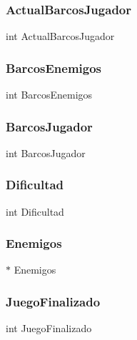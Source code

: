 \subsubsection{Actual\+Barcos\+Jugador}
{\footnotesize\ttfamily int Actual\+Barcos\+Jugador}

\label{struct_board_a5e5259bb1e509797d3ab3e435b14d17f} 
\subsubsection{Barcos\+Enemigos}
{\footnotesize\ttfamily int Barcos\+Enemigos}

\label{struct_board_ac2241783b723066e28738dd0cbb2624e} 
\subsubsection{Barcos\+Jugador}
{\footnotesize\ttfamily int Barcos\+Jugador}

\label{struct_board_a33e91e208e69c833cb1f04c86f371337} 
\subsubsection{Dificultad}
{\footnotesize\ttfamily int Dificultad}

\label{struct_board_ae46a086677666832abca3fdc41d463ea} 
\subsubsection{Enemigos}
{\footnotesize{}$\ast$ Enemigos}

\label{struct_board_ad607508d45f757dbbdc5ecf00c0d8914} 
\subsubsection{Juego\+Finalizado}
{\footnotesize\ttfamily int Juego\+Finalizado}

\label{struct_board_aecaa9350d2cb95844ec688b8e76b7da6} 
